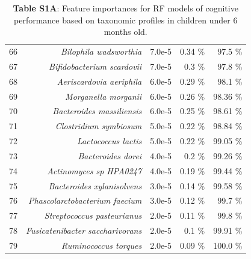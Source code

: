 \documentclass{article}
\begin{document}
\begin{table}[h]
\begin{centering}
\begin{tabular}{|r|r|r|r|r|}
      66 & \textit{Bilophila wadsworthia} & 7.0e-5 & 0.34 \% & 97.5 \% \\
      67 & \textit{Bifidobacterium scardovii} & 7.0e-5 & 0.3 \% & 97.8 \% \\
      68 & \textit{Aeriscardovia aeriphila} & 6.0e-5 & 0.29 \% & 98.1 \% \\
      69 & \textit{Morganella morganii} & 6.0e-5 & 0.26 \% & 98.36 \% \\
      70 & \textit{Bacteroides massiliensis} & 6.0e-5 & 0.25 \% & 98.61 \% \\
      71 & \textit{Clostridium symbiosum} & 5.0e-5 & 0.22 \% & 98.84 \% \\
      72 & \textit{Lactococcus lactis} & 5.0e-5 & 0.22 \% & 99.05 \% \\
      73 & \textit{Bacteroides dorei} & 4.0e-5 & 0.2 \% & 99.26 \% \\
      74 & \textit{Actinomyces sp HPA0247} & 4.0e-5 & 0.19 \% & 99.44 \% \\
      75 & \textit{Bacteroides xylanisolvens} & 3.0e-5 & 0.14 \% & 99.58 \% \\
      76 & \textit{Phascolarctobacterium faecium} & 3.0e-5 & 0.12 \% & 99.7 \% \\
      77 & \textit{Streptococcus pasteurianus} & 2.0e-5 & 0.11 \% & 99.8 \% \\
      78 & \textit{Fusicatenibacter saccharivorans} & 2.0e-5 & 0.1 \% & 99.91 \% \\
      79 & \textit{Ruminococcus torques} & 2.0e-5 & 0.09 \% & 100.0 \% \\\hline\hline
    \end{tabular}
    \caption*{
        \textbf{Table S1A}: Feature importances for RF models of cognitive performance
        based on taxonomic profiles in children under 6 months old.
    }
    \end{centering}
  \end{table}
\end{document}
